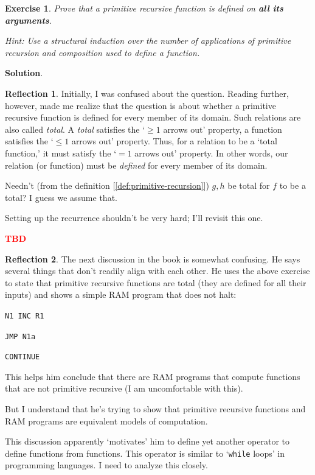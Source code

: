 \documentclass[11pt]{book}
\theoremstyle{definition}
\theoremstyle{plain}
\newtheorem{exercise}{Exercise}[chapter]
\theoremstyle{problemstyle}
\theoremstyle{remark}
\theoremstyle{definition}
\newtheorem{reflection}{Reflection}
\newcommand{\tbd}{
    \vspace{5mm}
    \textbf{\textcolor{red}{\Large{TBD}}}
    \vspace{5mm}
}
\begin{document}
\begin{exercise}
    Prove that a primitive recursive function is defined on \textbf{all its arguments}.

    Hint: Use a structural induction over the number of applications of primitive recursion and composition used to define a function.
\end{exercise}
\textbf{Solution}.
\begin{reflection}
    Initially, I was confused about the question. Reading further, however, made me realize that the question is about whether a primitive recursive function is defined for every member of its domain. Such relations are also called \emph{total}. A \emph{total} satisfies the `$\geq1$ arrows out' property, a function satisfies the `$\leq1$ arrows out' property. Thus, for a relation to be a `total function,' it must satisfy the `$=1$ arrows out' property. In other words, our relation (or function) must be \emph{defined} for every member of its domain.

    Needn't (from the definition [\ref{def:primitive-recursion}]) $g,h$ be total for $f$ to be a total? I guess we assume that.

    Setting up the recurrence shouldn't be very hard; I'll revisit this one.
\end{reflection}
\tbd

\begin{reflection}
    The next discussion in the book is somewhat confusing. He says several things that don't readily align with each other. He uses the above exercise to state that primitive recursive functions are total (they are defined for all their inputs) and shows a simple RAM program that does not halt:

    \texttt{N1 INC R1}

    \texttt{\quad JMP N1a}

    \texttt{\quad CONTINUE}

    This helps him conclude that there are RAM programs that compute functions that are not primitive recursive (I am uncomfortable with this).

But I understand that he's trying to show that primitive recursive functions and RAM programs are equivalent models of computation.


    This discussion apparently `motivates' him to define yet another operator to define functions from functions. This operator is similar to `\texttt{while} loops' in programming languages. I need to analyze this closely.
\end{reflection}
\end{document}
